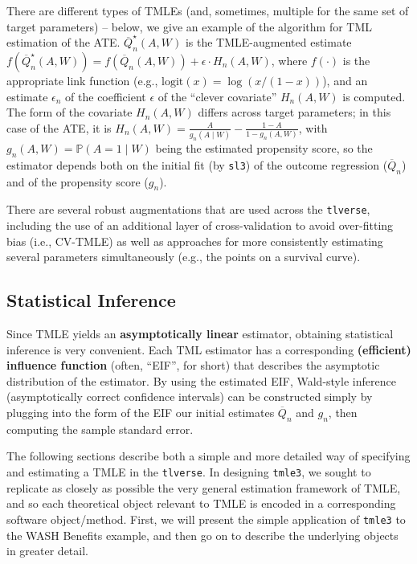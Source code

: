 \documentclass[12pt, krantz2,]{book}
\theoremstyle{definition}
\theoremstyle{definition}
\theoremstyle{definition}
\newcommand{\1}{\mathbbm{1}}
\begin{document}
There are different types of TMLEs (and, sometimes, multiple for the same set of
target parameters) -- below, we give an example of the algorithm for TML
estimation of the ATE. \(\overline{Q}^{\star}_n(A,W)\) is the TMLE-augmented
estimate \(f(\overline{Q}^{\star}_n(A,W)) = f(\overline{Q}_n(A,W)) + \epsilon \cdot H_n(A,W)\), where \(f(\cdot)\) is the appropriate link function (e.g.,
\(\text{logit}(x) = \log(x / (1 - x))\)), and an estimate \(\epsilon_n\) of the
coefficient \(\epsilon\) of the ``clever covariate'' \(H_n(A,W)\) is computed. The
form of the covariate \(H_n(A,W)\) differs across target parameters; in this case
of the ATE, it is \(H_n(A,W) = \frac{A}{g_n(A \mid W)} - \frac{1-A}{1-g_n(A, W)}\), with \(g_n(A,W) = \mathbb{P}(A=1 \mid W)\) being the estimated propensity
score, so the estimator depends both on the initial fit (by \texttt{sl3}) of the
outcome regression (\(\overline{Q}_n\)) and of the propensity score (\(g_n\)).

There are several robust augmentations that are used across the \texttt{tlverse},
including the use of an additional layer of cross-validation to avoid
over-fitting bias (i.e., CV-TMLE) as well as approaches for more consistently
estimating several parameters simultaneously (e.g., the points on a survival
curve).

\hypertarget{tmle-infer}{%
\subsection{Statistical Inference}\label{tmle-infer}}

Since TMLE yields an \textbf{asymptotically linear} estimator, obtaining statistical
inference is very convenient. Each TML estimator has a corresponding
\textbf{(efficient) influence function} (often, ``EIF'', for short) that describes the
asymptotic distribution of the estimator. By using the estimated EIF, Wald-style
inference (asymptotically correct confidence intervals) can be constructed
simply by plugging into the form of the EIF our initial estimates
\(\overline{Q}_n\) and \(g_n\), then computing the sample standard error.

The following sections describe both a simple and more detailed way of
specifying and estimating a TMLE in the \texttt{tlverse}. In designing \texttt{tmle3}, we
sought to replicate as closely as possible the very general estimation framework
of TMLE, and so each theoretical object relevant to TMLE is encoded in a
corresponding software object/method. First, we will present the simple
application of \texttt{tmle3} to the WASH Benefits example, and then go on to describe
the underlying objects in greater detail.
\end{document}
